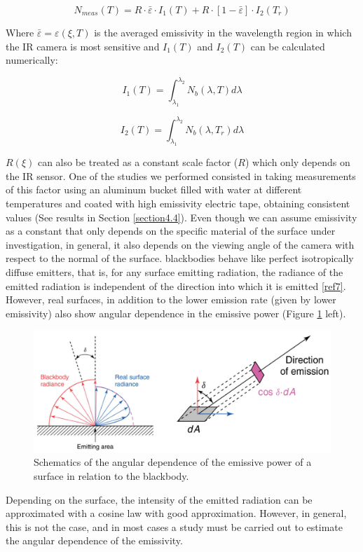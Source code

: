 		\begin{equation}\label{eq1.16}
			N_{meas}(T)= R \cdot \bar{\varepsilon} \cdot I_{1}(T) + R \cdot [1- \bar{\varepsilon}] \cdot I_{2}(T_{r})
		\end{equation}\bigskip
		
		Where $\bar{\varepsilon}=\varepsilon(\xi,T)$ is the averaged emissivity in the wavelength region in which the IR camera is most sensitive and $I_{1}(T)$ and $I_{2}(T)$ can be calculated numerically:
		
		\begin{equation}\label{eq3.10}
			I_{1}(T)=\int_{\lambda_{1}}^{\lambda_{2}} N_{b}(\lambda,T) d\lambda
		\end{equation}
		
		\begin{equation}\label{eq3.11}
			I_{2}(T)=\int_{\lambda_{1}}^{\lambda_{2}} N_{b}(\lambda,T_{r}) d\lambda
		\end{equation}\bigskip
		
		$R(\xi)$ can also be treated as a constant scale factor ($R$) which only depends on the IR sensor. One of the studies we performed consisted in taking measurements of this factor using an aluminum bucket filled with water at different temperatures and coated with high emissivity electric tape, obtaining consistent values (See results in Section \ref{section4.4}).
		Even though we can assume emissivity as a constant that only depends on the specific material of the surface under investigation, in general, it also depends on the viewing angle of the camera with respect to the normal of the surface. blackbodies behave like perfect isotropically diffuse emitters, that is, for any surface emitting radiation, the radiance of the emitted radiation is independent of the direction into which it is emitted \ref{ref7}. However, real surfaces, in addition to the lower emission rate (given by lower emissivity) also show angular dependence in the emissive power (Figure \ref{fig1.7} left).
		
		\begin{figure}[ht!]
			\centering
			\captionsetup{justification=centering,margin=2cm}
			\includegraphics[scale=0.35]{Figures/Chapter01/AngularDistributionSchematics.jpg}
			\caption{Schematics of the angular dependence of the emissive power of a surface in relation to the blackbody.}\label{fig1.7}
		\end{figure}
		
		Depending on the surface, the intensity of the emitted radiation can be approximated with a cosine law with good approximation. However, in general, this is not the case, and in most cases a study must be carried out to estimate the angular dependence of the emissivity.
		